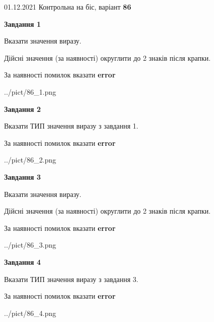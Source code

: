 \documentclass[11pt, ukrainian]{article}
\begin{document}
{01.12.2021 Контрольна на біс, варіант  \No \textbf { 86 }\par}
{
\begin {large}
{\begin {center}\textbf{Завдання 1}\end {center}}\par
Вказати значення виразу. \par
Дійсні значення (за наявності) округлити до 2 знаків після крапки. \par
За наявності помилок вказати \textbf{error}

\begin{center}
	{../pict/86_1.png}
\end{center}
\newpage

{\begin {center}\textbf{Завдання 2}\end {center}}\par
Вказати ТИП значення виразу з завдання 1. \par
За наявності помилок вказати \textbf{error}

\begin{center}
	{../pict/86_2.png}
\end{center}
\newpage

{\begin {center}\textbf{Завдання 3}\end {center}}\par
Вказати значення виразу. \par
Дійсні значення (за наявності) округлити до 2 знаків після крапки. \par
За наявності помилок вказати \textbf{error}

\begin{center}
	{../pict/86_3.png}
\end{center}
\newpage

{\begin {center}\textbf{Завдання 4}\end {center}}\par
Вказати ТИП значення виразу з завдання 3. \par
За наявності помилок вказати \textbf{error}

\begin{center}
	{../pict/86_4.png}
\end{center}
\newpage


\end{large}}
\end{document}
